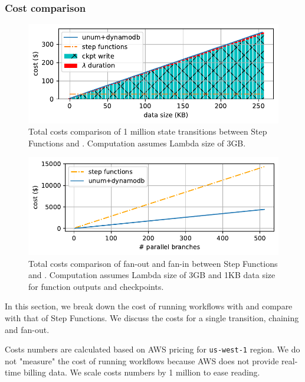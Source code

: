 \subsubsection{Cost comparison}

\begin{figure}[t!]
    \centering
    \includegraphics[width=\columnwidth]{figures/TotalCost.pdf}
    \caption{Total costs comparison of 1 million state transitions between
    Step Functions and \name{}. Computation assumes Lambda size of 3GB. }
    \label{fig:total-costs-single}
\end{figure}

\begin{figure}[t!]
    \centering
    \includegraphics[width=\columnwidth]{figures/TotalMapCost.pdf}
    \caption{Total costs comparison of fan-out and fan-in between Step
    Functions and \name{}. Computation assumes Lambda size of 3GB and 1KB data
    size for function outputs and checkpoints.}
    \label{fig:total-costs-map}
\end{figure}



In this section, we break down the cost of running workflows with \name{} and
compare with that of Step Functions. We discuss the costs for a single transition,
chaining and fan-out.

Costs numbers are calculated based on AWS pricing for \texttt{us-west-1}
region. We do not "measure" the cost of running workflows because AWS does not
provide real-time billing data. We scale costs numbers by 1 million to ease
reading.

